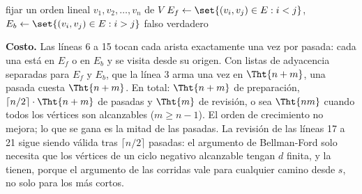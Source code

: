 \documentclass[11pt,letterpaper]{article}
\begin{document}
\begin{algorithm}[H]
\caption{\textsc{Bellman-Ford-Yen}$(G, w, s)$}
\label{alg:caminos-yen}
\begin{algorithmic}[1]
  \State fijar un orden lineal $v_1, v_2, \dots, v_n$ de $V$
  \State $E_f \gets \set{(v_i, v_j) \in E : i < j}$, \quad
         $E_b \gets \set{(v_i, v_j) \in E : i > j}$
  \State {}
     
        \State {}
      \EndFor
    \EndFor
     
        \State {}
      \EndFor
    \EndFor
  \EndFor
      \State \Return falso 
    \EndIf
  \EndFor
  \State \Return verdadero
\EndProcedure
\end{algorithmic}
\end{algorithm}

\textbf{Costo.} Las líneas 6 a 15 tocan cada arista exactamente una
vez por pasada: cada una está en $E_f$ o en $E_b$ y se visita desde su
origen. Con listas de adyacencia separadas para $E_f$ y $E_b$, que la
línea 3 arma una vez en $\Tht{n + m}$, una pasada cuesta
$\Tht{n + m}$. En total: $\Tht{n + m}$ de preparación,
$\lceil n/2 \rceil \cdot \Tht{n + m}$ de pasadas y $\Tht{m}$ de
revisión, o sea $\Tht{nm}$ cuando todos los vértices son alcanzables
($m \ge n - 1$). El orden de crecimiento no mejora; lo que se gana es
la mitad de las pasadas. La revisión de las líneas 17 a 21 sigue
siendo válida tras $\lceil n/2 \rceil$ pasadas: el argumento de
Bellman-Ford solo necesita que los vértices de un ciclo negativo
alcanzable tengan $d$ finita, y la tienen, porque el argumento de las
corridas vale para cualquier camino desde $s$, no solo para los más
cortos.
\end{document}
